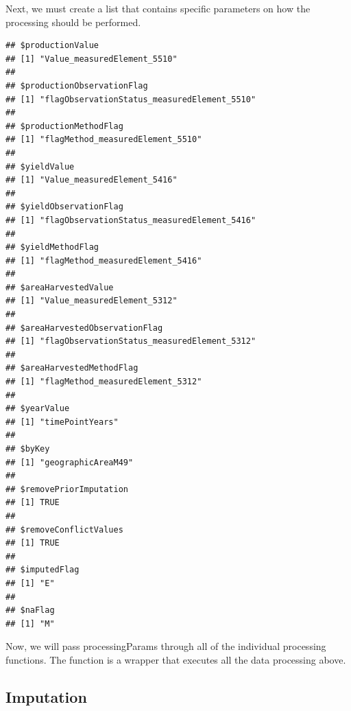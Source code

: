 \documentclass[nojss]{jss}
\begin{document}
Next, we must create a list that contains specific parameters on how the
processing should be performed.

\begin{knitrout}
\color{fgcolor}\begin{kframe}
\begin{alltt}
 \hlkwb{=} \hlstd{()}
\end{alltt}
\begin{verbatim}
## $productionValue
## [1] "Value_measuredElement_5510"
## 
## $productionObservationFlag
## [1] "flagObservationStatus_measuredElement_5510"
## 
## $productionMethodFlag
## [1] "flagMethod_measuredElement_5510"
## 
## $yieldValue
## [1] "Value_measuredElement_5416"
## 
## $yieldObservationFlag
## [1] "flagObservationStatus_measuredElement_5416"
## 
## $yieldMethodFlag
## [1] "flagMethod_measuredElement_5416"
## 
## $areaHarvestedValue
## [1] "Value_measuredElement_5312"
## 
## $areaHarvestedObservationFlag
## [1] "flagObservationStatus_measuredElement_5312"
## 
## $areaHarvestedMethodFlag
## [1] "flagMethod_measuredElement_5312"
## 
## $yearValue
## [1] "timePointYears"
## 
## $byKey
## [1] "geographicAreaM49"
## 
## $removePriorImputation
## [1] TRUE
## 
## $removeConflictValues
## [1] TRUE
## 
## $imputedFlag
## [1] "E"
## 
## $naFlag
## [1] "M"
\end{verbatim}
\end{kframe}
\end{knitrout}

Now, we will pass processingParams through all of the individual processing
functions.  The function  is a wrapper that
executes all the data processing above.

\begin{knitrout}
\color{fgcolor}\begin{kframe}
\begin{alltt}
 \hlkwb{=} 
\hlstd{(} 
                         
\end{alltt}
\end{kframe}
\end{knitrout}

\subsection{Imputation}
\end{document}
